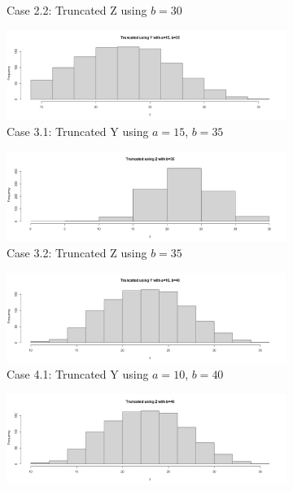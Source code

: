 \documentclass[12pt,letterpaper]{article}
\begin{document}
\begin{enumerate}[label=\Alph*]
\begin{figure}[H]
\begin{subfigure}[H]{0.49\textwidth}
          \caption*{\footnotesize Case 2.2: Truncated Z using $b=30$}
        \end{subfigure}
        \begin{subfigure}[H]{0.49\textwidth}
          \includegraphics[width=\textwidth]{Y-15-35.png}
          \caption*{\footnotesize Case 3.1: Truncated Y using $a=15$, $b=35$}
        \end{subfigure}
        \begin{subfigure}[H]{0.49\textwidth}
          \includegraphics[width=\textwidth]{Z-35.png}
          \caption*{\footnotesize Case 3.2: Truncated Z using $b=35$}
        \end{subfigure}
        \begin{subfigure}[H]{0.49\textwidth}
          \includegraphics[width=\textwidth]{Y-10-40.png}
          \caption*{\footnotesize Case 4.1: Truncated Y using $a=10$, $b=40$}
        \end{subfigure}
        \begin{subfigure}[H]{0.49\textwidth}
          \includegraphics[width=\textwidth]{Z-40.png}

\end{subfigure}
\end{figure}
\end{enumerate}
\end{document}
